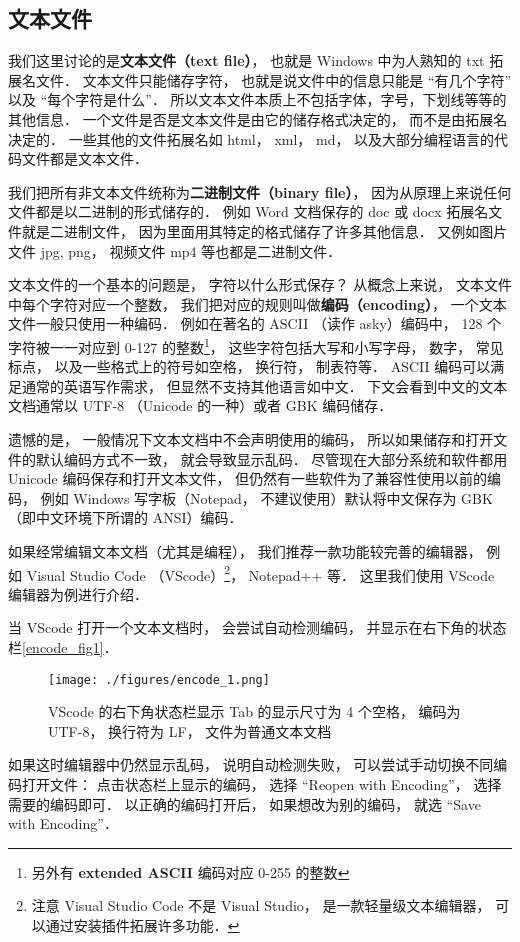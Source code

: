 
\subsection{文本文件}
我们这里讨论的是\textbf{文本文件（text file）}， 也就是 Windows 中为人熟知的 txt 拓展名文件． 文本文件只能储存字符， 也就是说文件中的信息只能是 “有几个字符” 以及 “每个字符是什么”． 所以文本文件本质上不包括字体，字号，下划线等等的其他信息． 一个文件是否是文本文件是由它的储存格式决定的， 而不是由拓展名决定的． 一些其他的文件拓展名如 html， xml， md， 以及大部分编程语言的代码文件都是文本文件．

我们把所有非文本文件统称为\textbf{二进制文件（binary file）}， 因为从原理上来说任何文件都是以二进制的形式储存的． 例如 Word 文档保存的 doc 或 docx 拓展名文件就是二进制文件， 因为里面用其特定的格式储存了许多其他信息．  又例如图片文件 jpg, png， 视频文件 mp4 等也都是二进制文件．

文本文件的一个基本的问题是， 字符以什么形式保存？ 从概念上来说， 文本文件中每个字符对应一个整数， 我们把对应的规则叫做\textbf{编码（encoding）}， 一个文本文件一般只使用一种编码． 例如在著名的 ASCII （读作 asky）编码中， 128 个字符被一一对应到 0-127 的整数\footnote{另外有 \textbf{extended ASCII} 编码对应 0-255 的整数}， 这些字符包括大写和小写字母， 数字， 常见标点， 以及一些格式上的符号如空格， 换行符， 制表符等． ASCII 编码可以满足通常的英语写作需求， 但显然不支持其他语言如中文． 下文会看到中文的文本文档通常以 UTF-8 （Unicode 的一种）或者 GBK 编码储存．

遗憾的是， 一般情况下文本文档中不会声明使用的编码， 所以如果储存和打开文件的默认编码方式不一致， 就会导致显示乱码． 尽管现在大部分系统和软件都用 Unicode 编码保存和打开文本文件， 但仍然有一些软件为了兼容性使用以前的编码， 例如 Windows 写字板（Notepad， 不建议使用）默认将中文保存为 GBK（即中文环境下所谓的 ANSI）编码．

如果经常编辑文本文档（尤其是编程）， 我们推荐一款功能较完善的编辑器， 例如 Visual Studio Code （VScode）\footnote{注意 Visual Studio Code 不是 Visual Studio， 是一款轻量级文本编辑器， 可以通过安装插件拓展许多功能．}， Notepad++ 等． 这里我们使用 VScode 编辑器为例进行介绍．

当 VScode 打开一个文本文档时， 会尝试自动检测编码， 并显示在右下角的状态栏\autoref{encode_fig1}．
\begin{figure}[ht]
\centering
\texttt{[image: ./figures/encode\_1.png]}
\caption{VScode 的右下角状态栏显示 Tab 的显示尺寸为 4 个空格， 编码为 UTF-8， 换行符为 LF， 文件为普通文本文档} \label{encode_fig1}
\end{figure}
如果这时编辑器中仍然显示乱码， 说明自动检测失败， 可以尝试手动切换不同编码打开文件： 点击状态栏上显示的编码， 选择 “Reopen with Encoding”， 选择需要的编码即可． 以正确的编码打开后， 如果想改为别的编码， 就选 “Save with Encoding”．


